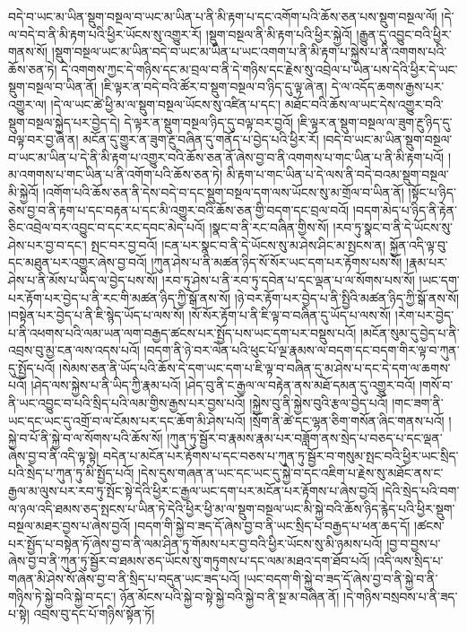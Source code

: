 བདེ་བ་ཡང་མ་ཡིན་སྡུག་བསྔལ་བ་ཡང་མ་ཡིན་པ་ནི་མི་རྟག་པ་དང་འགོག་པའི་ཆོས་ཅན་པས་སྡུག་བསྔལ་ལོ། །དེ་ལ་བདེ་བ་ནི་མི་རྟག་པའི་ཕྱིར་ཡོངས་སུ་འགྱུར་རོ། །སྡུག་བསྔལ་ནི་མི་རྟག་པའི་ཕྱིར་སྐྱེའོ། །རྒྱུན་དུ་འབྱུང་བའི་ཕྱིར་གནས་སོ། །སྡུག་བསྔལ་ཡང་མ་ཡིན་བདེ་བ་ཡང་མ་ཡིན་པ་ཡང་འགག་པ་ནི་མི་རྟག་པ་སྐྱེས་པ་ནི་འགགས་པའི་ཆོས་ཅན་ཏེ། དེ་འགགས་ཀྱང་དེ་གཉིས་དང་མ་བྲལ་བ་ནི་དེ་གཉིས་དང་རྗེས་སུ་འབྲེལ་པ་ཡིན་པས་དེའི་ཕྱིར་དེ་ཡང་སྡུག་བསྔལ་བ་ཡིན་ནོ། །ཇི་ལྟར་ན་བདེ་བའི་ཚོར་བ་སྡུག་བསྔལ་བ་ཉིད་དུ་ལྟ་ཞེ་ན། དེ་ལ་འདོད་ཆགས་རྒྱས་པར་འགྱུར་ལ། །དེ་ལ་ཡང་ཚེ་ཕྱི་མ་ལ་སྡུག་བསྔལ་ཡོངས་སུ་འཛིན་པ་དང་། མཐོང་བའི་ཆོས་ལ་ཡང་དེས་འགྱུར་བའི་སྡུག་བསྔལ་སྐྱེད་པར་བྱེད་དེ། དེ་ལྟར་ན་སྡུག་བསྔལ་ཉིད་དུ་བལྟ་བར་བྱའོ། །ཇི་ལྟར་ན་སྡུག་བསྔལ་ལ་ཟུག་རྔུ་ཉིད་དུ་བལྟ་བར་བྱ་ཞེ་ན། མངོན་དུ་གྱུར་ན་ཟུག་རྔུ་བཞིན་དུ་གནོད་པ་བྱེད་པའི་ཕྱིར་རོ། །བདེ་བ་ཡང་མ་ཡིན་སྡུག་བསྔལ་བ་ཡང་མ་ཡིན་པ་དེ་ནི་མི་རྟག་པ་འགྱུར་བའི་ཆོས་ཅན་ནོ་ཞེས་བྱ་བ་ནི་འགགས་པ་གང་ཡིན་པ་ནི་མི་རྟག་པའོ། །མ་འགགས་པ་གང་ཡིན་པ་ནི་འགོག་པའི་ཆོས་ཅན་ཏེ། མི་རྟག་པ་གང་ཡིན་པ་དེ་ལས་ནི་བདེ་བའམ་སྡུག་བསྔལ་མི་སྐྱེའོ། །འགོག་པའི་ཆོས་ཅན་ནི་དེས་བདེ་བ་དང་སྡུག་བསྔལ་དག་ལས་ཡོངས་སུ་མ་གྲོལ་བ་ཡིན་ནོ། །སྟོང་པ་ཉིད་ཅེས་བྱ་བ་ནི་རྟག་པ་དང་བརྟན་པ་དང་མི་འགྱུར་བའི་ཆོས་ཅན་གྱི་བདག་དང་བྲལ་བའོ། །བདག་མེད་པ་ཉིད་ནི་རྟེན་ཅིང་འབྲེལ་བར་འབྱུང་བ་དང་རང་དབང་མེད་པའོ། །སྣང་བ་ནི་རང་བཞིན་གྱིས་སོ། །རབ་ཏུ་སྣང་བ་ནི་དེ་ཡོངས་སུ་ཤེས་པར་བྱ་བ་དང་། སྤང་བར་བྱ་བའོ། །ངན་པར་སྣང་བ་ནི་དེ་ཡོངས་སུ་མ་ཤེས་ཤིང་མ་སྤངས་ན། སྐྱོན་འདི་ལྟ་བུ་དང་མཐུན་པར་འགྱུར་ཞེས་བྱ་བའོ། །ཀུན་ཤེས་པ་ནི་མཚན་ཉིད་སོ་སོར་ཡང་དག་པར་རྟོགས་པས་སོ། །རྣམ་པར་ཤེས་པ་ནི་མོས་པ་ཡིད་ལ་བྱེད་པས་སོ། །རབ་ཏུ་ཤེས་པ་ནི་རབ་ཏུ་དབེན་པ་དང་ལྡན་པ་ལ་སོགས་པས་སོ། །ཡང་དག་པར་རྟོག་པར་བྱེད་པ་ནི་རང་གི་མཚན་ཉིད་ཀྱི་སྒོ་ནས་སོ། །ཉེ་བར་རྟོག་པར་བྱེད་པ་ནི་སྤྱིའི་མཚན་ཉིད་ཀྱི་སྒོ་ནས་སོ། །བསྟེན་པར་བྱེད་པ་ནི་ཇི་སྙེད་ཡོད་པ་ལས་སོ། །སོ་སོར་རྟོག་པ་ནི་ཇི་ལྟ་བ་བཞིན་དུ་ཡོད་པ་ལས་སོ། །རེག་པར་བྱེད་པ་ནི་འཕགས་པའི་ལམ་ཡན་ལག་བརྒྱད་ཚངས་པར་སྤྱོད་པས་ཡང་དག་པར་བསྡུས་པའོ། །མངོན་སུམ་དུ་བྱེད་པ་ནི་འབྲས་བུ་མྱ་ངན་ལས་འདས་པའོ། །བདག་ནི་ཉེ་བར་ལེན་པའི་ཕུང་པོ་ལྔ་རྣམས་ལ་བདག་དང་བདག་གིར་ལྟ་བ་ཀུན་དུ་སྤྱོད་པའོ། །སེམས་ཅན་ནི་ཡོད་པའི་ཆོས་དེ་དག་ཡང་དག་པ་ཇི་ལྟ་བ་བཞིན་དུ་མ་ཤེས་པ་དང་དེ་དག་ལ་ཆགས་པའོ། །ཤེད་ལས་སྐྱེས་པ་ནི་ཡིད་ཀྱི་རྣམ་པའོ། །ཤེད་བུ་ནི་ང་རྒྱལ་ལ་བརྟེན་ནས་མཐོ་དམན་དུ་འགྱུར་བའོ། །གསོ་བ་ནི་ཡང་འབྱུང་བ་པའི་སྲིད་པའི་ལམ་གྱིས་རྒྱས་པར་བྱས་པའོ། །སྐྱེས་བུ་ནི་སྐྱེས་བུའི་རྩལ་བྱེད་པའོ། །གང་ཟག་ནི་ཡང་དང་ཡང་དུ་འགྲོ་བ་ལ་ངོམས་པར་དང་ཆོག་མི་ཤེས་པའོ། །སྲོག་ནི་ཚེ་དང་ལྷན་ཅིག་གསོན་ཞིང་གནས་པའོ། །སྐྱེ་བ་པོ་ནི་སྐྱེ་བ་ལ་སོགས་པའི་ཆོས་སོ། །ཀུན་ཏུ་སྦྱོར་བ་རྣམས་རྣམ་པར་བཟློག་ནས་སྲེད་པ་བཅད་པ་དང་ལྡན་ཞེས་བྱ་བ་ནི་འདི་ལྟ་སྟེ། བདེན་པ་མངོན་པར་རྟོགས་པ་དང་བཅས་པ་ཀུན་ཏུ་སྦྱོར་བ་གསུམ་སྤང་བའི་ཕྱིར་ཡང་སྲིད་པའི་སྲེད་པ་ཀུན་ཏུ་མི་སྤྱོད་པའོ། །དེས་དུས་གཞན་ན་ཡང་དང་ཡང་དུ་སྐྱེ་བ་དང་འཇིག་པ་རྗེས་སུ་མཐོང་ནས་ང་རྒྱལ་མ་ལུས་པར་རབ་ཏུ་སྤོང་སྟེ་དེའི་ཕྱིར་ང་རྒྱལ་ཡང་དག་པར་མངོན་པར་རྟོགས་པ་ཞེས་བྱའོ། །དེའི་སྲེད་པའི་བག་ལ་ཉལ་འདི་ཐམས་ཅད་སྤངས་པ་ཡིན་ཏེ་དེའི་ཕྱིར་ཕྱི་མ་ལ་སྡུག་བསྔལ་ཡང་མི་སྐྱེ་བའི་ཆོས་ཉིད་རྙེད་པའི་ཕྱིར་སྡུག་བསྔལ་མཐར་བྱས་པ་ཞེས་བྱའོ། །བདག་གི་སྐྱེ་བ་ཟད་དོ་ཞེས་བྱ་བ་ནི་ཡང་སྲིད་པ་བརྒྱད་པ་ཕན་ཆད་དོ། །ཚངས་པར་སྤྱོད་པ་བསྟེན་ཏོ་ཞེས་བྱ་བ་ནི་ལམ་ཤིན་ཏུ་གོམས་པར་བྱ་བའི་ཕྱིར་ཡོངས་སུ་མི་ཉམས་པའོ། །བྱ་བ་བྱས་པ་ཞེས་བྱ་བ་ནི་ཀུན་ཏུ་སྦྱོར་བ་ཐམས་ཅད་ཡོངས་སུ་གཏུགས་པ་དང་ལམ་མཐའ་དག་ཐོབ་པའོ། །འདི་ལས་སྲིད་པ་གཞན་མི་ཤེས་སོ་ཞེས་བྱ་བ་ནི་སྲིད་པ་བདུན་ཡང་ཟད་པའོ། །ཡང་བདག་གི་སྐྱེ་བ་ཟད་དོ་ཞེས་བྱ་བ་ནི་སྐྱེ་བ་ནི་གཉིས་ཏེ་སྐྱེ་བའི་སྐྱེ་བ་དང་། ཉོན་མོངས་པའི་སྐྱེ་བ་སྟེ་སྐྱེ་བའི་སྐྱེ་བ་ནི་སྔ་མ་བཞིན་ནོ། །དེ་གཉིས་བསྲབས་པ་ནི་ཟད་པ་སྟེ། འབྲས་བུ་དང་པོ་གཉིས་སྟོན་ཏོ། 